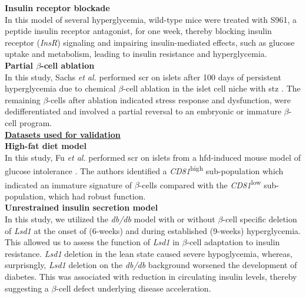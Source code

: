 \textbf{Insulin receptor blockade\\}
In this model of several hyperglycemia, wild-type mice were treated with S961, a peptide insulin receptor antagonist, for one week, thereby blocking insulin receptor (\textit{InsR}) signaling and impairing insulin-mediated effects, such as glucose uptake and metabolism, leading to insulin resistance and hyperglycemia.\\

\textbf{Partial $\beta$-cell ablation\\}
In this study, Sachs \textit{et al.} performed \gls{scr} on islets after 100 days of persistent hyperglycemia due to chemical $\beta$-cell ablation in the islet cell niche with \gls{stz} \textbf{\cite{sachs_targeted_2020}}. The remaining $\beta$-cells after ablation indicated  stress response and dysfunction, were dedifferentiated and involved a partial reversal to an embryonic or immature $\beta$-cell program.\\

\underline{\normalsize \textbf{Datasets used for validation}}\\

\textbf{High-fat diet model\\}
In this study, Fu \textit{et al.} performed \gls{scr} on islets from a \gls{hfd}-induced mouse model of glucose intolerance \textbf{\cite{fu_single-cell_2023}}. The authors identified a \textit{CD81}\textsuperscript{high} sub-population which indicated an immature signature of $\beta$-cells compared with the \textit{CD81}\textsuperscript{low} sub-population, which had robust function.\\

\textbf{Unrestrained insulin secretion model\\}
In this study, we utilized the \textit{db/db} model with or without $\beta$-cell specific deletion of \textit{Lsd1} at the onset of (6-weeks) and during established (9-weeks) hyperglycemia. This allowed us to assess the function of \textit{Lsd1} in $\beta$-cell adaptation to insulin resistance. \textit{Lsd1} deletion in the lean state caused severe hypoglycemia, whereas, surprisngly, \textit{Lsd1} deletion on the \textit{db/db} background worsened the development of diabetes. This was associated with reduction in circulating insulin levels, thereby suggesting a $\beta$-cell defect underlying disease acceleration.\\ 

